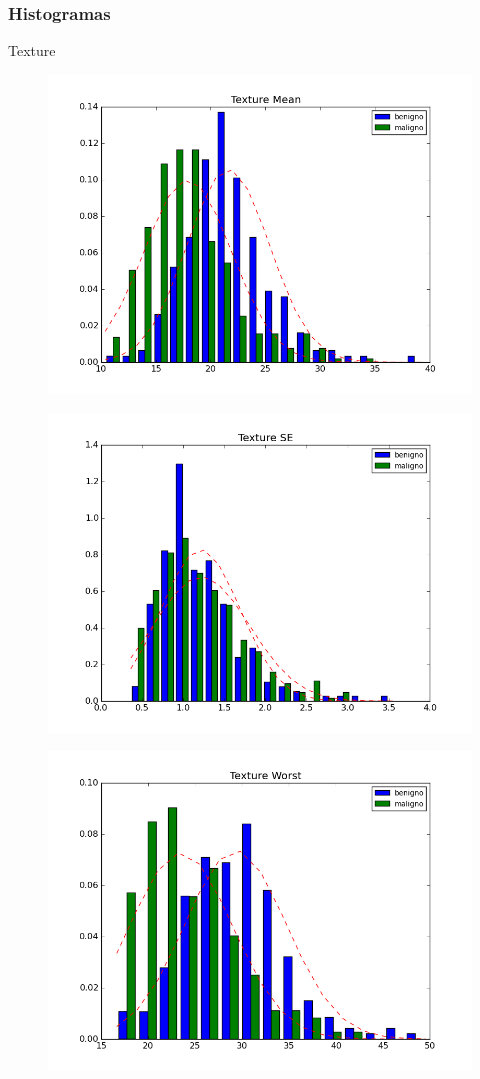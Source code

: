 \documentclass{beamer}
\begin{document}
\begin{frame}
\frametitle{Histogramas}
Texture
\begin{figure}[H]
\centering
  \includegraphics[width=.3\linewidth]{./Histogramas/Texture_Mean}
  \label{fig:test1}
\end{figure}%

\begin{figure}[H]
\centering
\begin{minipage}{.3\textwidth}
  \centering
  \includegraphics[width=\linewidth]{./Histogramas/Texture_SE}
  \label{fig:test1}
\end{minipage}%
\begin{minipage}{.3\textwidth}
  \centering
  \includegraphics[width=\linewidth]{./Histogramas/Texture_Worst}
  \label{fig:test2}
\end{minipage}
\end{figure}
\end{frame}
\end{document}
